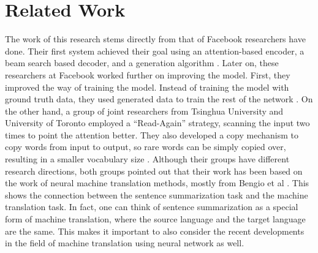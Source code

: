 \documentclass[letterpaper]{article} %
\begin{document}
\section{Related Work}
The work of this research stems directly from that of Facebook researchers have done. Their first system achieved their goal using an attention-based encoder, a beam search based decoder, and a generation algorithm \cite{rush2015neural}. Later on, these researchers at Facebook worked further on improving the model. First, they improved the way of training the model. Instead of training the model with ground truth data, they used generated data to train the rest of the network \cite{ranzato2015sequence}. On the other hand, a group of joint researchers from Tsinghua University and University of Toronto employed a “Read-Again” strategy, scanning the input two times to point the attention better. They also developed a copy mechanism to copy words from input to output, so rare words can be simply copied over, resulting in a smaller vocabulary size \cite{zeng2016efficient}. Although their groups have different research directions, both groups pointed out that their work has been based on the work of neural machine translation methods, mostly from Bengio et al \cite{bahdanau2014neural}. This shows the connection between the sentence summarization task and the machine translation task. In fact, one can think of sentence summarization as a special form of machine translation, where the source language and the target language are the same. This makes it important to also consider the recent developments in the field of machine translation using neural network as well.
\end{document}
